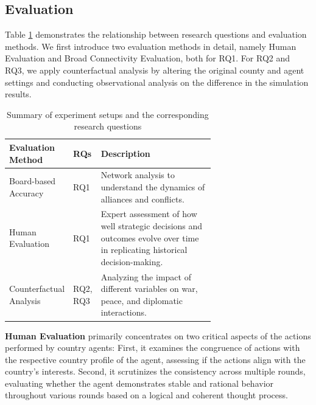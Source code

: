 \documentclass{article}
\begin{document}

\subsection{Evaluation}

Table \ref{table:experiment-summary} demonstrates the relationship between research questions and evaluation methods. We first introduce two evaluation methods in detail, namely Human Evaluation and Broad Connectivity Evaluation, both for RQ1. For RQ2 and RQ3, we apply counterfactual analysis by altering the original county and agent settings and conducting observational analysis on the difference in the simulation results.

\begin{table}[!ht]
    \centering
    \begin{tabular}{lp{0.07\linewidth}p{0.6\linewidth}}
        \toprule
        \textbf{Evaluation Method} & \textbf{RQs} & \textbf{Description} \\
        \midrule
        Board-based Accuracy & RQ1 & Network analysis to understand the dynamics of alliances and conflicts. \\
        \midrule
        Human Evaluation & RQ1 & Expert assessment of how well strategic decisions and outcomes evolve over time in replicating historical decision-making. \\
        \midrule
        Counterfactual Analysis & RQ2, RQ3 & Analyzing the impact of different variables on war, peace, and diplomatic interactions. \\
        \bottomrule
    \end{tabular}
    \caption{Summary of experiment setups and the corresponding research questions}
    \label{table:experiment-summary}
\end{table}


\textbf{Human Evaluation} primarily concentrates on two critical aspects of the actions performed by country agents: First, it examines the congruence of actions with the respective country profile of the agent, assessing if the actions align with the country's interests. Second, it scrutinizes the consistency across multiple rounds, evaluating whether the agent demonstrates stable and rational behavior throughout various rounds based on a logical and coherent thought process.
\end{document}
